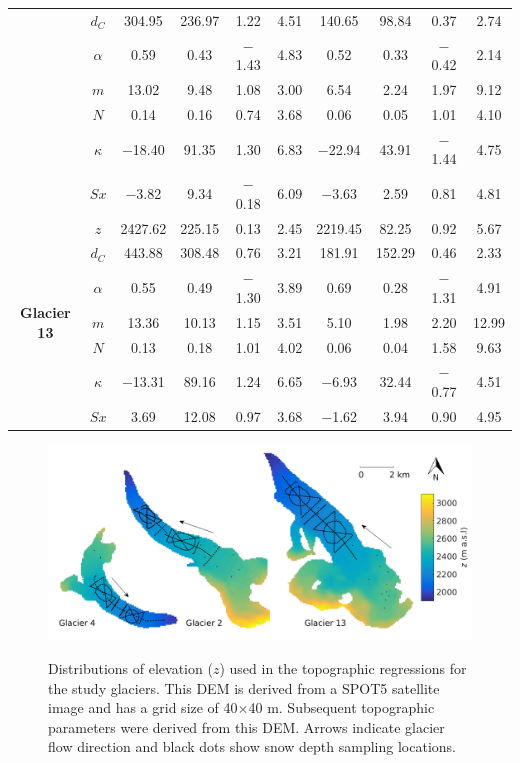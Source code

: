 \documentclass{sfuthesis}
\newcommand{\topomap}{Arrows indicate glacier flow direction and black dots show snow depth sampling locations. }
\begin{document}
\begin{table}
\begin{tabular}{cc|cccc|cccc}
 & $d_C$ & 304.95 & 236.97 & 1.22 & 4.51 & 140.65 & 98.84 & 0.37 & 2.74 \\
 & $\alpha$ & 0.59 & 0.43 & $-$1.43 & 4.83 & 0.52 & 0.33 & $-$0.42 & 2.14 \\
 & $m$ & 13.02 & 9.48 & 1.08 & 3.00 & 6.54 & 2.24 & 1.97 & 9.12 \\
 & $N$ & 0.14 & 0.16 & 0.74 & 3.68 & 0.06 & 0.05 & 1.01 & 4.10 \\
 & $\kappa$ & $-$18.40 & 91.35 & 1.30 & 6.83 & $-$22.94 & 43.91 & $-$1.44 & 4.75 \\
 & $Sx$ & $-$3.82 & 9.34 & $-$0.18 & 6.09 & $-$3.63 & 2.59 & 0.81 & 4.81 \\ \hline
\multirow{7}{*}{\textbf{Glacier 13}} & $z$ & 2427.62 & 225.15 & 0.13 & 2.45 & 2219.45 & 82.25 & 0.92 & 5.67 \\
 & $d_C$ & 443.88 & 308.48 & 0.76 & 3.21 & 181.91 & 152.29 & 0.46 & 2.33 \\
 & $\alpha$ & 0.55 & 0.49 & $-$1.30 & 3.89 & 0.69 & 0.28 & $-$1.31 & 4.91 \\
 & $m$ & 13.36 & 10.13 & 1.15 & 3.51 & 5.10 & 1.98 & 2.20 & 12.99 \\
 & $N$ & 0.13 & 0.18 & 1.01 & 4.02 & 0.06 & 0.04 & 1.58 & 9.63 \\
 & $\kappa$ & $-$13.31 & 89.16 & 1.24 & 6.65 & $-$6.93 & 32.44 & $-$0.77 & 4.51 \\
 & $Sx$ & 3.69 & 12.08 & 0.97 & 3.68 & $-$1.62 & 3.94 & 0.90 & 4.95
\end{tabular}
\end{table}

\pagebreak
\begin{figure}[H]
	\centering
	\includegraphics[width = \textwidth]{Map_elevation.png}\\
	\caption{Distributions of elevation ($z$) used in the topographic regressions for the study glaciers. This DEM is derived from a SPOT5 satellite image and has a grid size of 40$\times$40 m. Subsequent topographic parameters were derived from this DEM. \topomap}
	\label{map:elev}
\end{figure}
\end{document}
